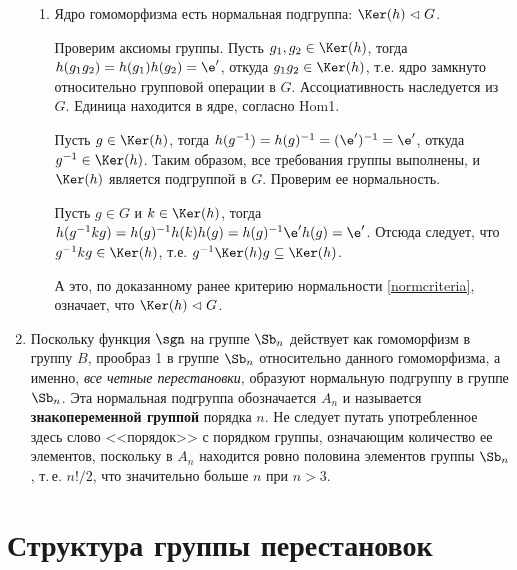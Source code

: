 \begin{enumerate}
\begin{enumerate}[\bf Hom1]
\item Ядро гомоморфизма есть нормальная подгруппа: $\Ker(h)\vartriangleleft G$.

Проверим аксиомы группы. Пусть $g_1, g_2\in \Ker(h)$, тогда $h(g_1g_2)=h(g_1)h(g_2)=\e'$, откуда $g_1g_2\in\Ker(h)$, т.е. ядро замкнуто относительно групповой операции в $G$. Ассоциативность наследуется из $G$. Единица находится в ядре, согласно Hom1.

Пусть $g\in\Ker(h)$, тогда $h(g^{-1})=h(g)^{-1}=(\e')^{-1}=\e'$, откуда $g^{-1}\in\Ker(h)$. Таким образом, все требования группы выполнены, и $\Ker(h)$ является подгруппой в $G$. Проверим ее нормальность.

Пусть $g\in G$ и $k\in\Ker(h)$, тогда $h(g^{-1}kg)=h(g)^{-1}h(k)h(g)=h(g)^{-1}\e'h(g)=\e'$. Отсюда следует, что $g^{-1}kg\in\Ker(h)$, т.е. $g^{-1}\Ker(h)g\subseteq \Ker(h)$.

А это, по доказанному ранее критерию нормальности \eqref{normcriteria}, означает, что $\Ker(h)\vartriangleleft G$.

\end{enumerate}

\item Поскольку функция $\sgn$ на группе $\Sb_n$ действует как гомоморфизм в группу $B$, прообраз 1 в группе $\Sb_n$ относительно данного гомоморфизма, а именно, \textit{все четные перестановки}, образуют нормальную подгруппу в группе  $\Sb_n$. Эта нормальная подгруппа обозначается $A_n$ и называется \textbf{знакопеременной группой} порядка $n$. Не следует путать употребленное здесь слово <<порядок>> с порядком группы, означающим количество ее элементов, поскольку в $A_n$ находится ровно половина элементов группы $\Sb_n$, т.\,е. $n!/2$, что значительно больше $n$ при $n>3$.

\end{enumerate}



\section{Структура группы перестановок}



